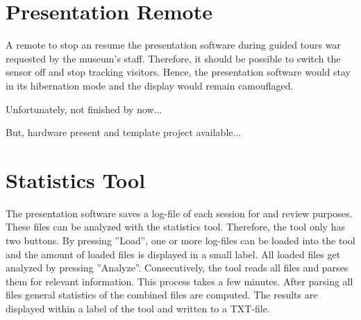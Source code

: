 \section{Presentation Remote}
\label{implementation_remote}

A remote to stop an resume the presentation software during guided tours war requested by the museum's staff. Therefore, it should be possible to switch the sensor off and stop tracking visitors. Hence, the presentation software would stay in its hibernation mode and the display would remain camouflaged.

Unfortunately, not finished by now...

But, hardware present and template project available...

%


\section{Statistics Tool}
\label{implementation_tool}
 
The presentation software saves a log-file of each session for and review purposes. These files can be analyzed with the statistics tool. Therefore, the tool only has two buttons. By pressing ''Load'', one or more log-files can be loaded into the tool and the amount of loaded files is displayed in a small label. All loaded files get analyzed by pressing ''Analyze''. Consecutively, the tool reads all files and parses them for relevant information. This process takes a few minutes. After parsing all files general statistics of the combined files are computed. The results are displayed within a label of the tool and written to a TXT-file.


